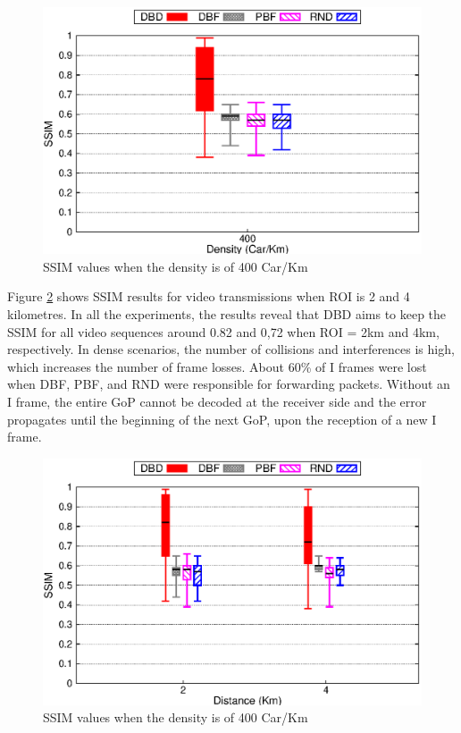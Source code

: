 \documentclass{sig-alternate-2013}
\begin{document}
\begin{figure}[tb]
\begin{center}
\includegraphics[width=.9\columnwidth]{./fig/selected/barSSIMxDen.eps}
\caption{SSIM values when the density is of 400 Car/Km}
\label{fig:SSIM2}
\end{center}
\end{figure}


Figure \ref{fig:SSIM3} shows SSIM results for video transmissions when ROI is 2 and 4 kilometres. In all the experiments, the results reveal that DBD aims to keep the SSIM for all video sequences around 0.82 and 0,72 when ROI = 2km and 4km, respectively. In dense scenarios, the number of collisions and interferences is high, which increases the number of frame losses. About 60\% of I frames were lost when DBF, PBF, and RND were responsible for forwarding packets. Without an I frame, the entire GoP cannot be decoded at the receiver side and the error propagates until the beginning of the next GoP, upon the reception of a new I frame.


\begin{figure}[tb]
\begin{center}
\includegraphics[width=.9\columnwidth]{./fig/selected/barSSIMxKm.eps}
\caption{SSIM values when the density is of 400 Car/Km}
\label{fig:SSIM3}
\end{center}
\end{figure}
\end{document}
